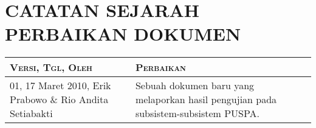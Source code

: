 \part*{\textcolor{sectioncolor}{\textsf{\large CATATAN SEJARAH PERBAIKAN DOKUMEN}}}

\begin{tabular}{|p{4cm}|p{11cm}|}
\hline
{\scshape Versi, Tgl, Oleh} & {\scshape Perbaikan}\\
\hline
01, 17 Maret 2010, Erik Prabowo \& Rio Andita Setiabakti & Sebuah dokumen baru yang melaporkan hasil pengujian pada subsistem-subsistem PUSPA.\\
\hline
\end{tabular}
